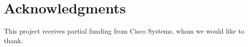 \documentclass{acm_proc_article-sp}
\begin{document}
\section{Acknowledgments}
This project receives partial funding from Cisco Systems, whom we would like to
thank.


%
%
\end{document}
